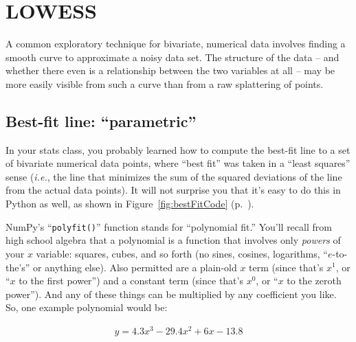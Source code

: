 \chapter{LOWESS}



A common exploratory technique for bivariate, numerical data involves finding a
smooth curve to approximate a noisy data set. The structure of the data -- and
whether there even is a relationship between the two variables at all -- may be
more easily visible from such a curve than from a raw splattering of points.

\section{Best-fit line: ``parametric''}


In your stats class, you probably learned how to compute the best-fit line
to a set of bivariate numerical data points, where ``best fit'' was taken in a
``least squares'' sense (\textit{i.e.}, the line that minimizes the sum of the
squared deviations of the line from the actual data points). It will not
surprise you that it's easy to do this in Python as well, as
shown in Figure~\ref{fig:bestFitCode} (p.~\pageref{fig:bestFitCode}).



NumPy's ``\texttt{polyfit()}'' function stands for ``polynomial fit.'' You'll
recall from high school algebra that a polynomial is a function that involves
only \textit{powers} of your $x$ variable: squares, cubes, and so forth (no
sines, cosines, logarithms, ``$e$-to-the's'' or anything else). Also permitted
are a plain-old $x$ term (since that's $x^1$, or ``$x$ to the first power'')
and a constant term (since that's $x^0$, or ``$x$ to the zeroth power''). And
any of these things can be multiplied by any coefficient you like. So, one
example polynomial would be:

\begin{align*}
y = 4.3 x^3 - 29.4 x^2 + 6 x - 13.8
\end{align*}
\vspace{-.25in}

